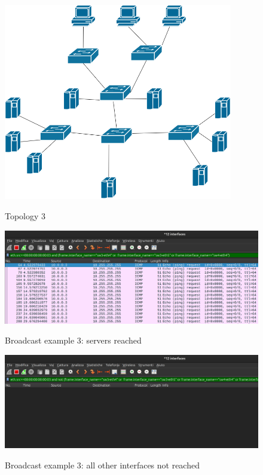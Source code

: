 \documentclass{article}
\begin{document}
\begin{figure}[H]
    \includegraphics[width=10cm, center]{images/3-topo.png}
    \label{fig:3topo}
    \caption{Topology 3}
\end{figure}

\begin{figure}[H]
    \includegraphics[width=12cm, center]{images/3-reached.png}
    \label{fig:3reac}
    \caption{Broadcast example 3: servers reached}
\end{figure}

\begin{figure}[H]
    \includegraphics[width=12cm, center]{images/3-unreached.png}
    \label{fig:3unreac}
    \caption{Broadcast example 3: all other interfaces not reached}
\end{figure}
\end{document}
